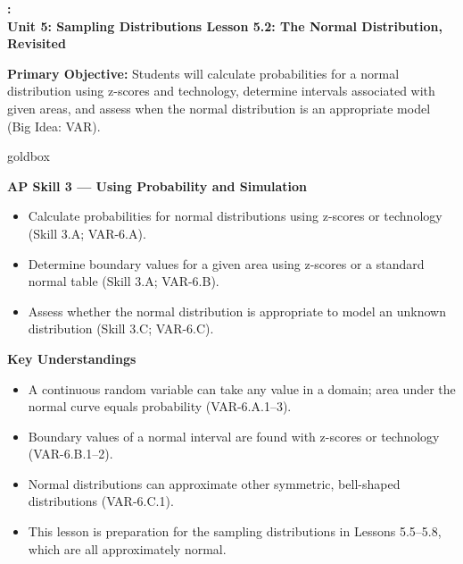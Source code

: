 \documentclass[10pt]{article}
\newcommand{\UnitNumberName}{Unit 5: Sampling Distributions \quad}
\newcommand{\LessonNumberName}{Lesson 5.2: The Normal Distribution, Revisited}
\begin{document}
\begin{center}
    {\Large\bfseries \CourseName: \SchoolYear \\
    {\small\bfseries \UnitNumberName \LessonNumberName}}
\end{center}

\begin{tcolorbox}[colback=sky, colframe=navy, boxrule=0.9pt, arc=2mm,
    left=2mm, right=2mm, top=1.5mm, bottom=1.5mm]
    \textbf{Primary Objective:} Students will calculate probabilities for a normal
    distribution using z-scores and technology, determine intervals associated with
    given areas, and assess when the normal distribution is an appropriate model
    (Big Idea: VAR).
\end{tcolorbox}

\renewcommand{\arraystretch}{1.6}
\begin{skillbox}{goldbox}
\begin{minipage}[t]{0.48\linewidth}
    \textbf{AP Skill 3 --- Using Probability and Simulation}
    \begin{itemize}
        \item Calculate probabilities for normal distributions using z-scores or
              technology (Skill 3.A; VAR-6.A).
        \item Determine boundary values for a given area using z-scores or a standard
              normal table (Skill 3.A; VAR-6.B).
        \item Assess whether the normal distribution is appropriate to model an unknown
              distribution (Skill 3.C; VAR-6.C).
    \end{itemize}
\end{minipage}
\hfill
\begin{minipage}[t]{0.48\linewidth}
    \textbf{Key Understandings}
    \begin{itemize}
        \item A continuous random variable can take any value in a domain; area under
              the normal curve equals probability (VAR-6.A.1--3).
        \item Boundary values of a normal interval are found with z-scores or
              technology (VAR-6.B.1--2).
        \item Normal distributions can approximate other symmetric, bell-shaped
              distributions (VAR-6.C.1).
        \item This lesson is preparation for the sampling distributions in Lessons
              5.5--5.8, which are all approximately normal.
    \end{itemize}
\end{minipage}
\end{skillbox}
\end{document}
